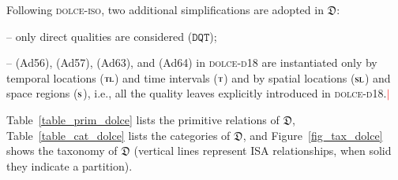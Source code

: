 \documentclass[ao]{iosart2x}
\newcommand{\nb}[1]{\textcolor{red}{$|$}\marginpar{\hspace*{-0cm}\parbox{20mm}{\scriptsize\raggedright\textcolor{red}{#1}}}}
\newcommand{\bflist}{\begin{list}{}{\setlength{\topsep}{2mm}\setlength{\parsep}{0mm}\setlength{\leftmargin}{9.2mm}\setlength{\labelwidth}{8mm}}}
\newcommand{\eflist}{\end{list}}
\newcommand{\dolceAxLabel}{\textrm{a$_\texttt{d}$}}
\newcommand{\dolceDefLabel}{\textrm{d$_\texttt{d}$}}
\newcommand{\refdolceax}[1]{({\dolceAxLabel}\ref{#1})}
\newcommand{\refdolcedf}[1]{({\dolceDefLabel}\ref{#1})}
\newcommand{\pr}[1]{\mathtt{#1}}
\newcommand{\dolce}{{\textsc{dolce}}}
\newcommand{\dolceorig}{{\textsc{dolce-d{\footnotesize 18}}}}
\newcommand {\thdolce} {\ensuremath{\mathfrak{D}}}
\newcommand {\Sdcat} {\textsc{s}}
\newcommand {\SLdcat} {\textsc{sl}}
\newcommand {\TLdcat} {\textsc{tl}}
\newcommand {\Tdcat} {\textsc{t}}
\newcommand {\PREd} {\ensuremath{\pr{PRE}}}
\newcommand {\DQTd} {\ensuremath{\pr{DQT}}}
\begin{document}
Following {\dolce-\textsc{iso}}, two additional simplifications are adopted in $\thdolce$:  
%
\bflist
\item[--] only direct qualities are considered ($\DQTd$);
\item[--]	(Ad56), (Ad57), (Ad63), and (Ad64) in {\dolceorig} are instantiated only by temporal locations ($\TLdcat$) and time intervals ($\Tdcat$) and by spatial locations ($\SLdcat$) and space regions ($\Sdcat$), i.e., all the quality leaves explicitly introduced in {\dolceorig}.\nb{CM: non sono sicuro farei riferimento agli assiomi di dolce-d18 qui}

\eflist



Table~\ref{table_prim_dolce} lists the primitive relations of {$\thdolce$}, Table~\ref{table_cat_dolce} lists the categories  of {$\thdolce$}, and Figure~\ref{fig_tax_dolce} shows the taxonomy of {$\thdolce$} (vertical lines represent ISA relationships, when solid they indicate a partition). 
\end{document}
